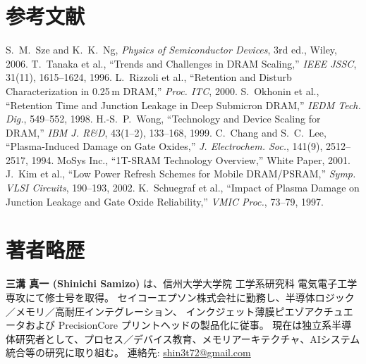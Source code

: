 \documentclass[conference]{IEEEtran}
\begin{document}
\section*{参考文献}
\begin{thebibliography}{00}
 S.~M.~Sze and K.~K.~Ng, \emph{Physics of Semiconductor Devices}, 3rd ed., Wiley, 2006.
 T.~Tanaka et al., ``Trends and Challenges in DRAM Scaling,'' \emph{IEEE JSSC}, 31(11), 1615--1624, 1996.
 L.~Rizzoli et al., ``Retention and Disturb Characterization in 0.25\,\textmu m DRAM,'' \emph{Proc. ITC}, 2000.
 S.~Okhonin et al., ``Retention Time and Junction Leakage in Deep Submicron DRAM,'' \emph{IEDM Tech. Dig.}, 549--552, 1998.
 H.-S.~P.~Wong, ``Technology and Device Scaling for DRAM,'' \emph{IBM J. R\&D}, 43(1–2), 133--168, 1999.
 C.~Chang and S.~C.~Lee, ``Plasma-Induced Damage on Gate Oxides,'' \emph{J. Electrochem. Soc.}, 141(9), 2512--2517, 1994.
 MoSys Inc., ``1T-SRAM Technology Overview,'' White Paper, 2001.
 J.~Kim et al., ``Low Power Refresh Schemes for Mobile DRAM/PSRAM,'' \emph{Symp. VLSI Circuits}, 190--193, 2002.
 K.~Schuegraf et al., ``Impact of Plasma Damage on Junction Leakage and Gate Oxide Reliability,'' \emph{VMIC Proc.}, 73--79, 1997.
\end{thebibliography}

\section*{著者略歴}
\noindent\textbf{三溝 真一 (Shinichi Samizo)} は、信州大学大学院 工学系研究科 電気電子工学専攻にて修士号を取得。
セイコーエプソン株式会社に勤務し、半導体ロジック／メモリ／高耐圧インテグレーション、
インクジェット薄膜ピエゾアクチュエータおよび PrecisionCore プリントヘッドの製品化に従事。
現在は独立系半導体研究者として、プロセス／デバイス教育、メモリアーキテクチャ、AIシステム統合等の研究に取り組む。
連絡先: \href{mailto:shin3t72@gmail.com}{shin3t72@gmail.com}
\end{document}
